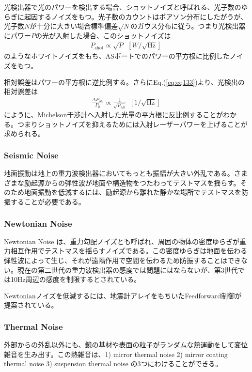 光検出器で光のパワーを検出する場合、ショットノイズと呼ばれる、光子数のゆらぎに起因するノイズをもつ。光子数のカウントはポアソン分布にしたがうが、光子数$N$が十分に大きい場合標準偏差$\sqrt{N}$のガウス分布に従う。つまり光検出器にパワー$P$の光が入射した場合、このショットノイズは
\begin{eqnarray}
  P_{\mathrm{shot}} \propto \sqrt{P}\ \ [W/\sqrt{\mathrm{Hz}}]  \label{eq:eq136}
\end{eqnarray}
のようなホワイトノイズをもち、ASポートでのパワーの平方根に比例したノイズをもつ。

相対誤差はパワーの平方根に逆比例する。さらにEq.(\ref{eq:eq133})より、光検出の相対誤差は
\begin{eqnarray}
  \frac{\Delta P_{\mathrm{AS}}}{P_{\mathrm{0}}}  \propto \frac{1}{\sqrt{P_{\mathrm{AS}}}}\ \ [1/\sqrt{\mathrm{Hz}}]  \label{eq:eq136}
\end{eqnarray}
にように、Michelson干渉計へ入射した光量の平方根に反比例することがわかる。つまりショットノイズを抑えるためには入射レーザーパワーを上げることが求められる。

\subsubsection{Seismic Noise}
地面振動は地上の重力波検出器においてもっとも振幅が大きい外乱である。さまざまな励起源からの弾性波が地面や構造物をつたわってテストマスを揺らす。そのため地面振動を低減するには、励起源から離れた静かな場所でテストマスを防振することが必要である。

\subsubsection{Newtonian Noise}
Newtonian Noise は、重力勾配ノイズとも呼ばれ、周囲の物体の密度ゆらぎが重力相互作用でテストマスを揺らすノイズである。この密度ゆらぎは地面を伝わる弾性波によって生じ、それが遠隔作用で空間を伝わるため防振することはできない。現在の第二世代の重力波検出器の感度では問題にはならないが、第3世代では10Hz周辺の感度を制限するとされている。

Newtonianノイズを低減するには、地震計アレイをもちいたFeedforward制御が提案されている。

\subsubsection{Thermal Noise}
外部からの外乱以外にも、鏡の基材や表面の粒子がランダムな熱運動をして変位雑音を生み出す。この熱雑音は、1) mirror thermal noise 2) mirror coating thermal noise 3) suspension thermal noise の3つにわけることができる\cite{dan2016study}。

